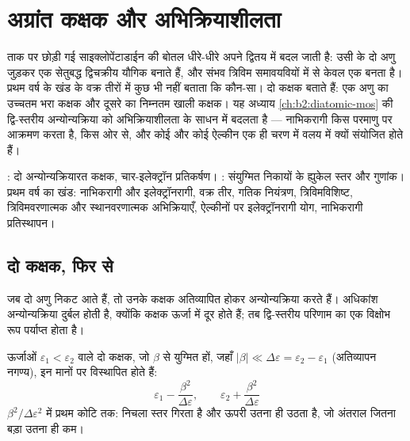 \chapter{अग्रांत कक्षक और अभिक्रियाशीलता}\label{ch:b2:frontier-orbitals}

ताक पर छोड़ी गई साइक्लोपेंटाडाईन की बोतल धीरे-धीरे अपने द्वितय में बदल जाती है:
उसी  के दो अणु जुड़कर एक सेतुबद्ध द्विचक्रीय यौगिक बनाते हैं, और
संभव त्रिविम समावयवियों में से केवल एक बनता है। प्रथम वर्ष के खंड के वक्र तीरों में
कुछ भी नहीं बताता कि कौन-सा। दो कक्षक बताते हैं: एक अणु का उच्चतम भरा
कक्षक और दूसरे का निम्नतम खाली कक्षक। यह
अध्याय \cref{ch:b2:diatomic-mos} की द्वि-स्तरीय अन्योन्यक्रिया को
अभिक्रियाशीलता के साधन में बदलता है --- नाभिकरागी किस परमाणु पर आक्रमण करता है, किस ओर से, और
कोई  और कोई ऐल्कीन एक ही चरण में वलय में क्यों संयोजित होते हैं।

\begin{recall}
: दो अन्योन्यक्रियारत कक्षक, चार-इलेक्ट्रॉन प्रतिकर्षण।
: संयुग्मित निकायों के ह्युकेल स्तर और गुणांक।
प्रथम वर्ष का खंड: नाभिकरागी और इलेक्ट्रॉनरागी, वक्र तीर, गतिक
नियंत्रण, त्रिविमविशिष्ट, त्रिविमवरणात्मक और स्थानवरणात्मक अभिक्रियाएँ,
ऐल्कीनों पर इलेक्ट्रॉनरागी योग, नाभिकरागी प्रतिस्थापन।
\end{recall}

\section{दो कक्षक, फिर से}

जब दो अणु निकट आते हैं, तो उनके कक्षक अतिव्यापित होकर अन्योन्यक्रिया करते हैं। अधिकांश
अन्योन्यक्रिया दुर्बल होती है, क्योंकि कक्षक ऊर्जा में दूर होते हैं; तब द्वि-स्तरीय परिणाम का
एक विक्षोभ रूप पर्याप्त होता है।

\begin{theorem}[दो स्तरों की दुर्बल अन्योन्यक्रिया]\label{thm:b2:frontier-orbitals:perturbation}
ऊर्जाओं $\varepsilon_1 < \varepsilon_2$ वाले दो कक्षक, जो 
$\beta$ से युग्मित हों, जहाँ $|\beta| \ll \Delta\varepsilon = \varepsilon_2 - \varepsilon_1$ (अतिव्यापन नगण्य), इन मानों पर
विस्थापित होते हैं:
\[
  \varepsilon_1 - \frac{\beta^2}{\Delta\varepsilon}, \qquad \varepsilon_2 + \frac{\beta^2}{\Delta\varepsilon}
\]
$\beta^2/\Delta\varepsilon^2$ में प्रथम कोटि तक: निचला स्तर गिरता है और ऊपरी उतना ही
उठता है, जो अंतराल जितना बड़ा उतना ही कम।
\end{theorem}

